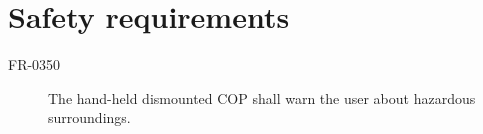 \section{Safety requirements}

\begin{description}
\item[FR-0350] The hand-held dismounted COP shall warn the user about hazardous surroundings.
\end{description}